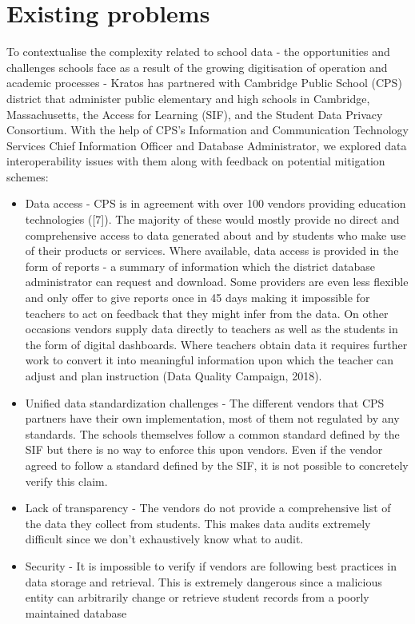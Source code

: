 \documentclass{article}
\begin{document}
\section{Existing problems}
To contextualise the complexity related to school data - the opportunities and challenges schools face as a result of the growing digitisation of operation and academic processes - Kratos has partnered with  Cambridge Public School (CPS) district that administer public elementary and high schools in Cambridge, Massachusetts, the Access for Learning (SIF), and the Student Data Privacy Consortium. With the help of CPS's Information and Communication Technology Services Chief Information Officer and Database Administrator, we explored data interoperability issues with them along with feedback on potential mitigation schemes:

\begin{itemize}
  \item Data access - CPS is in agreement with over 100 vendors providing education technologies ([7]). The majority of these would mostly provide no direct and comprehensive access to data generated about and by students who make use of their products or services. Where available, data access is  provided in the form of reports - a summary of information which the district database administrator can request and download. Some providers are even less flexible and only offer to give reports once in 45 days making it impossible for teachers to act on feedback that they might infer from the data. On other occasions vendors supply data directly to teachers as well as the students in the form of digital dashboards. Where teachers obtain data it requires further work to convert it into meaningful information upon which the teacher can adjust and plan instruction (Data Quality Campaign, 2018). 
  \item Unified data standardization challenges - The different vendors that CPS partners have their own implementation, most of them not regulated by any standards. The schools themselves follow a common standard defined by the SIF but there is no way to enforce this upon vendors. Even if the vendor agreed to follow a standard defined by the SIF, it is not possible to concretely verify this claim.
  \item Lack of transparency - The vendors do not provide a comprehensive list of the data they collect from students. This makes data audits extremely difficult since we don't exhaustively know what to audit.
  \item Security - It is impossible to verify if vendors are following best practices in data storage and retrieval. This is extremely dangerous since a malicious entity can arbitrarily change or retrieve student records from a poorly maintained database
\end{itemize}
\end{document}

